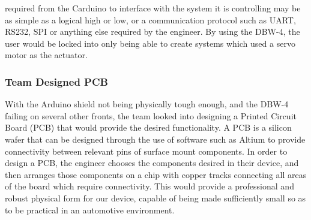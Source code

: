 required from the Carduino to interface with the system it is controlling may be as simple as a logical high or low, or a communication protocol such as UART, RS232, SPI or anything else required by the engineer. By using the DBW-4, the user would be locked into only being able to create systems which used a servo motor as the actuator.

\subsubsection{Team Designed PCB}
With the Arduino shield not being physically tough enough, and the DBW-4 failing on several other fronts, the team looked into designing a Printed Circuit Board (PCB) that would provide the desired functionality. A PCB is a silicon wafer that can be designed through the use of software such as Altium to provide connectivity between relevant pins of surface mount components. In order to design a PCB, the engineer chooses the components desired in their device, and then arranges those components on a chip with copper tracks connecting all areas of the board which require connectivity. This would provide a professional and robust physical form for our device, capable of being made sufficiently small so as to be practical in an automotive environment.

